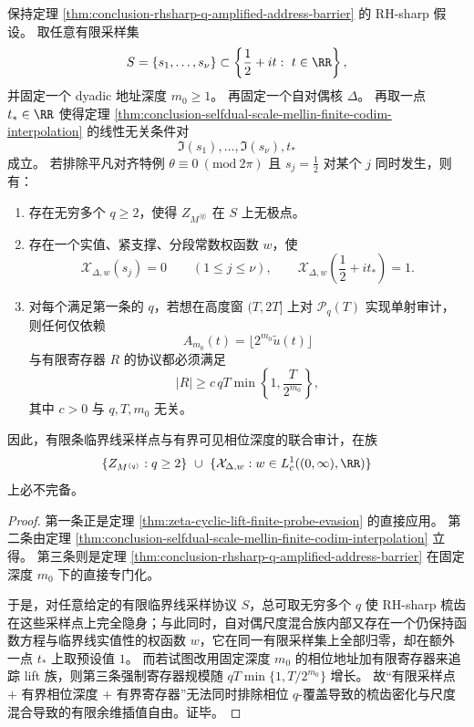 \begin{theorem}[有限临界线采样与有界相位深度的联合不完备性]\label{thm:conclusion-joint-finite-audit-incompleteness-phase-prefix-multiscale}
保持定理 \ref{thm:conclusion-rhsharp-q-amplified-address-barrier} 的 RH-sharp 假设。
取任意有限采样集
\[
S=\{s_1,\dots,s_\nu\}\subset \left\{\frac12+it:\ t\in\RR\right\},
\]
并固定一个 dyadic 地址深度 \(m_0\ge 1\)。
再固定一个自对偶核 \(\Delta\)。
再取一点 \(t_\ast\in\RR\) 使得定理 \ref{thm:conclusion-selfdual-scale-mellin-finite-codim-interpolation} 的线性无关条件对
\[
\Im(s_1),\dots,\Im(s_\nu),t_\ast
\]
成立。
若排除平凡对齐特例 \(\theta\equiv 0\ (\mathrm{mod}\ 2\pi)\) 且 \(s_j=\frac12\) 对某个 \(j\) 同时发生，则有：
\begin{enumerate}
  \item 存在无穷多个 \(q\ge 2\)，使得 \(Z_{M^{\langle q\rangle}}\) 在 \(S\) 上无极点。
  \item 存在一个实值、紧支撑、分段常数权函数 \(w\)，使
  \[
  \mathcal X_{\Delta,w}(s_j)=0\qquad(1\le j\le \nu),
  \qquad
  \mathcal X_{\Delta,w}\!\left(\frac12+it_\ast\right)=1.
  \]
  \item 对每个满足第一条的 \(q\)，若想在高度窗 \((T,2T]\) 上对 \(\mathcal P_q(T)\) 实现单射审计，则任何仅依赖
  \[
  A_{m_0}(t)=\lfloor 2^{m_0}\widetilde u(t)\rfloor
  \]
  与有限寄存器 \(R\) 的协议都必须满足
  \[
  |R|
  \ge
  c\,qT\min\!\left\{1,\frac{T}{2^{m_0}}\right\},
  \]
  其中 \(c>0\) 与 \(q,T,m_0\) 无关。
\end{enumerate}
因此，有限条临界线采样点与有界可见相位深度的联合审计，在族
\[
\{Z_{M^{\langle q\rangle}}:q\ge 2\}
\ \cup\
\{\mathcal X_{\Delta,w}: w\in L^1_c((0,\infty),\RR)\}
\]
上必不完备。
\end{theorem}
\begin{proof}
第一条正是定理 \ref{thm:zeta-cyclic-lift-finite-probe-evasion} 的直接应用。
第二条由定理 \ref{thm:conclusion-selfdual-scale-mellin-finite-codim-interpolation} 立得。
第三条则是定理 \ref{thm:conclusion-rhsharp-q-amplified-address-barrier} 在固定深度 \(m_0\) 下的直接专门化。

于是，对任意给定的有限临界线采样协议 \(S\)，总可取无穷多个 \(q\) 使 RH-sharp 梳齿在这些采样点上完全隐身；与此同时，自对偶尺度混合族内部又存在一个仍保持函数方程与临界线实值性的权函数 \(w\)，它在同一有限采样集上全部归零，却在额外一点 \(t_\ast\) 上取预设值 \(1\)。
而若试图改用固定深度 \(m_0\) 的相位地址加有限寄存器来追踪 lift 族，则第三条强制寄存器规模随 \(qT\min\{1,T/2^{m_0}\}\) 增长。
故“有限采样点 \(+\) 有界相位深度 \(+\) 有界寄存器”无法同时排除相位 \(q\)-覆盖导致的梳齿密化与尺度混合导致的有限余维插值自由。证毕。
\end{proof}
